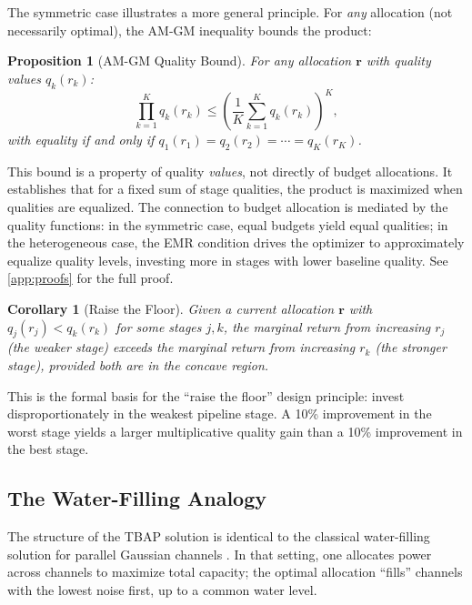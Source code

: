\documentclass[11pt, a4paper, copyright]{googledeepmind}
\newtheorem{proposition}{Proposition}[section]
\newtheorem{corollary}{Corollary}[section]
\begin{document}
The symmetric case illustrates a more general principle. For \emph{any} allocation (not necessarily optimal), the AM-GM inequality bounds the product:

\begin{proposition}[AM-GM Quality Bound]\label{prop:amgm}
For any allocation $\mathbf{r}$ with quality values $q_k(r_k)$:
\begin{equation}\label{eq:weakest-link}
    \prod_{k=1}^K q_k(r_k) \leq \left(\frac{1}{K} \sum_{k=1}^K q_k(r_k)\right)^K,
\end{equation}
with equality if and only if $q_1(r_1) = q_2(r_2) = \cdots = q_K(r_K)$.
\end{proposition}

This bound is a property of quality \emph{values}, not directly of budget allocations. It establishes that for a fixed sum of stage qualities, the product is maximized when qualities are equalized. The connection to budget allocation is mediated by the quality functions: in the symmetric case, equal budgets yield equal qualities; in the heterogeneous case, the EMR condition drives the optimizer to approximately equalize quality levels, investing more in stages with lower baseline quality. See \cref{app:proofs} for the full proof.

\begin{corollary}[Raise the Floor]\label{cor:raise-floor}
Given a current allocation $\mathbf{r}$ with $q_j(r_j) < q_k(r_k)$ for some stages $j, k$, the marginal return from increasing $r_j$ (the weaker stage) exceeds the marginal return from increasing $r_k$ (the stronger stage), provided both are in the concave region.
\end{corollary}

This is the formal basis for the ``raise the floor'' design principle: invest disproportionately in the weakest pipeline stage. A 10\% improvement in the worst stage yields a larger multiplicative quality gain than a 10\% improvement in the best stage.

\subsection{The Water-Filling Analogy}

The structure of the TBAP solution is identical to the classical water-filling solution for parallel Gaussian channels \citep{cover2006}. In that setting, one allocates power across channels to maximize total capacity; the optimal allocation ``fills'' channels with the lowest noise first, up to a common water level.
\end{document}
